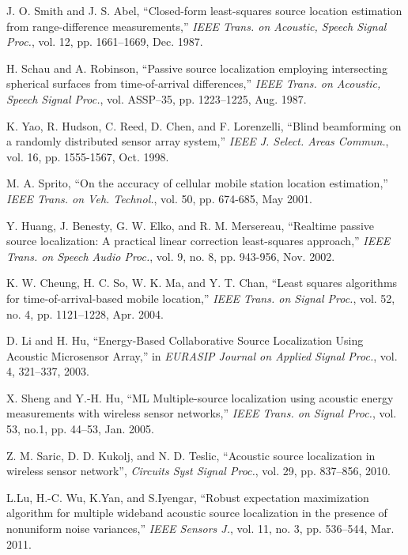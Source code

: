 \begin{thebibliography}{99}


J. O. Smith and J. S. Abel, ``Closed-form least-squares source location estimation from range-difference measurements,'' {\em IEEE Trans. on Acoustic, Speech Signal Proc.}, vol. 12, pp. 1661--1669, Dec. 1987.

H. Schau and A. Robinson, ``Passive source localization employing intersecting spherical surfaces from time-of-arrival differences,'' {\em IEEE Trans. on Acoustic, Speech Signal Proc.}, vol. ASSP--35, pp. 1223--1225, Aug. 1987.

K. Yao, R. Hudson, C. Reed, D. Chen, and F. Lorenzelli, ``Blind beamforming on a randomly distributed sensor array system,'' {\em IEEE J. Select. Areas Commun.}, vol. 16, pp. 1555-1567, Oct. 1998.

 M. A. Sprito, ``On the accuracy of cellular mobile station location estimation,'' {\em IEEE Trans. on Veh. Technol.}, vol. 50, pp. 674-685, May 2001.

 Y. Huang, J. Benesty, G. W. Elko, and R. M. Mersereau, ``Realtime passive source localization: A practical linear correction least-squares approach,'' {\em IEEE Trans. on Speech Audio Proc.}, vol. 9, no. 8, pp. 943-956, Nov. 2002.


 K. W. Cheung, H. C. So, W. K. Ma, and Y. T. Chan, ``Least squares algorithms for time-of-arrival-based mobile location,'' {\em IEEE Trans. on Signal Proc.}, vol. 52, no. 4, pp. 1121--1228, Apr. 2004.

D. Li and H. Hu, ``Energy-Based Collaborative Source Localization Using Acoustic Microsensor Array,'' in {\em EURASIP Journal on Applied Signal Proc.}, vol. 4, 321--337, 2003.

X. Sheng and Y.-H. Hu, ``ML Multiple-source localization using acoustic energy measurements with wireless sensor networks,'' {\em IEEE Trans. on Signal Proc.}, vol. 53, no.1, pp. 44--53, Jan. 2005.

Z. M. Saric, D. D. Kukolj, and N. D. Teslic, ``Acoustic source localization in wireless sensor network'', {\em Circuits Syst Signal Proc.}, vol. 29, pp. 837--856, 2010.

L.Lu, H.-C. Wu, K.Yan, and S.Iyengar, ``Robust expectation maximization algorithm for multiple wideband acoustic source localization  in  the  presence  of  nonuniform  noise  variances,'' {\em IEEE Sensors J.}, vol. 11, no. 3, pp. 536--544, Mar. 2011.


\end{thebibliography}
